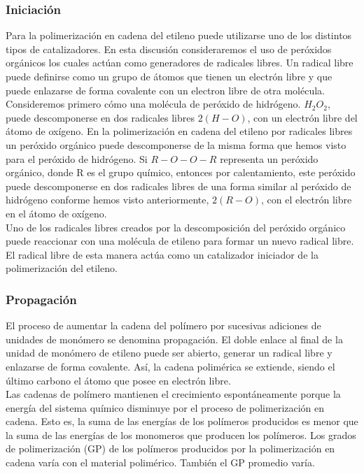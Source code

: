 \documentclass[a4paper, 11pt]{article}
\begin{document}
 \subsubsection{Iniciación}
 Para la polimerización en cadena del etileno puede utilizarse uno de los distintos tipos de catalizadores. En esta discusión consideraremos el uso de peróxidos orgánicos los cuales actúan como generadores de radicales libres. Un radical libre puede definirse como un grupo de átomos que tienen un electrón libre y que puede enlazarse de forma covalente con un electron libre de otra molécula. Consideremos primero cómo una molécula de peróxido de hidrógeno. $H_{2}O_{2}$, puede descomponerse en dos radicales libres $2(H-O)$, con un electrón libre del átomo de oxígeno. En la polimerización en cadena del etileno por radicales libres un peróxido orgánico puede descomponerse de la misma forma que hemos visto para el peróxido de hidrógeno. Si $R-O-O-R$ representa un peróxido orgánico, donde R es el grupo químico, entonces por calentamiento, este peróxido puede descomponerse en dos radicales libres de una forma similar al peróxido de hidrógeno conforme hemos visto anteriormente, $2(R-O)$, con el electrón libre en el átomo de oxígeno.\\
Uno de los radicales libres creados por la descomposición del peróxido orgánico puede reaccionar con una molécula de etileno para formar un nuevo radical libre. El radical libre de esta manera actúa como un catalizador iniciador de la polimerización del etileno.
\subsubsection{Propagación}
El proceso de aumentar la cadena del polímero por sucesivas adiciones de unidades de monómero se denomina propagación. El doble enlace al final de la unidad de monómero de etileno puede ser abierto, generar un radical libre y enlazarse de forma covalente. Así, la cadena polimérica se extiende, siendo el último carbono el átomo que posee en electrón libre.
\\

Las cadenas de polímero mantienen el crecimiento espontáneamente porque la energía del sistema químico disminuye por el proceso de polimerización en cadena. Esto es, la suma de las energías de los polímeros producidos es menor que la suma de las energías de los monomeros que producen los polímeros. Los grados de polimerización (GP) de los polímeros producidos por la polimerización en cadena varía con el material polimérico. También el GP promedio varía. 
\end{document}
